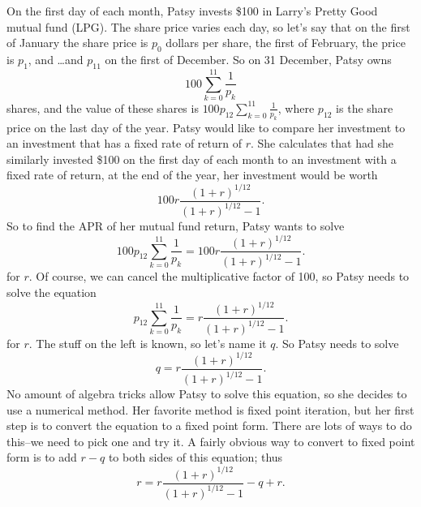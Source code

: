\documentclass[12pt,fleqn]{exam}
\begin{document}
 \begin{questions}
 
 \question On the first day of each month, Patsy invests \$100 in Larry's Pretty Good mutual fund  (LPG). The share price varies each day, so let's say that on the first of January the share price is $p_0$ dollars per share, the first of February, the 
 price is $p_1$, and \dots and $p_{11}$ on the first of December.   So on 31 December, Patsy owns
 \begin{equation}
    100 \sum_{k=0}^{11} \frac{1}{p_k}
 \end{equation}
 shares, and the value of these shares is  $\displaystyle 100 p_{12} \sum_{k=0}^{11} \frac{1}{p_k}$, where $p_{12}$ is the share price
on the last day of the year.  Patsy would like to compare her investment to an investment that has a fixed rate of return of $r$. 
She calculates that had she similarly invested \$100 on the first day of each month to an investment with a fixed rate of 
return, at the end of the year, her investment would be worth
\begin{equation}
    100 r \frac{(1+r)^{1/12}}{(1+r)^{1/12} - 1}.
\end{equation}
So to find the APR of her mutual fund return, Patsy wants to solve
\begin{equation}
 100 p_{12} \sum_{k=0}^{11} \frac{1}{p_k} = 100 r \frac{(1+r)^{1/12}}{(1+r)^{1/12} - 1}.
\end{equation}
for $r$.  Of course, we can cancel the multiplicative factor of 100, so Patsy needs to solve the equation
\begin{equation}
 p_{12} \sum_{k=0}^{11} \frac{1}{p_k} = r \frac{(1+r)^{1/12}}{(1+r)^{1/12} - 1}.
\end{equation}
for $r$.  The stuff on the left is known, so let's name it $q$.  So Patsy needs to solve
\begin{equation}
 q  = r \frac{(1+r)^{1/12}}{(1+r)^{1/12} - 1}.
\end{equation}
No amount of algebra tricks allow Patsy to solve this equation, so she decides to use a numerical
method.  Her favorite method is fixed point iteration, but her first step is to convert the equation to a fixed point form.
There are lots of ways to do this--we need to pick one and try it.  A fairly obvious way to convert to fixed point form
is to add $r-q$ to both sides of this equation; thus
\begin{equation}
   r  = r \frac{(1+r)^{1/12}}{(1+r)^{1/12} - 1} - q + r.
\end{equation}


\end{questions}
\end{document}
